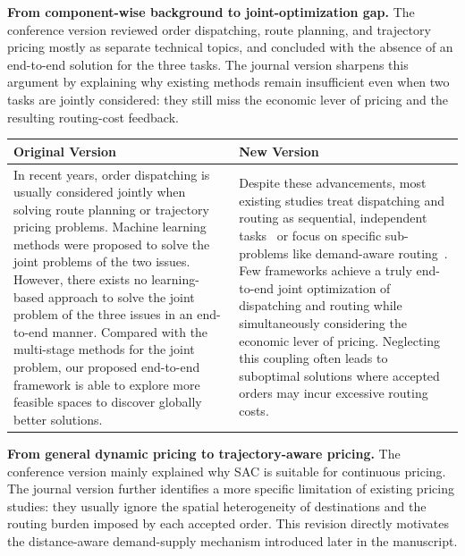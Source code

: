 \documentclass[11pt, a4paper]{article}
\begin{document}
\begin{itemize}
    \textbf{From component-wise background to joint-optimization gap.} The conference version reviewed order dispatching, route planning, and trajectory pricing mostly as separate technical topics, and concluded with the absence of an end-to-end solution for the three tasks. The journal version sharpens this argument by explaining why existing methods remain insufficient even when two tasks are jointly considered: they still miss the economic lever of pricing and the resulting routing-cost feedback.
    
    \begin{tabular}{|p{}|p{}|}
        \hline
        \textbf{Original Version} & \textbf{New Version}\\
        \hline
        In recent years, order dispatching is usually considered jointly when solving route planning or trajectory pricing problems. Machine learning methods were proposed to solve the joint problems of the two issues. However, there exists no learning-based approach to solve the joint problem of the three issues in an end-to-end manner. Compared with the multi-stage methods for the joint problem, our proposed end-to-end framework is able to explore more feasible spaces to discover globally better solutions. &
        Despite these advancements, most existing studies treat dispatching and routing as sequential, independent tasks~\cite{ref:DPEA} or focus on specific sub-problems like demand-aware routing~\cite{ref:DemandAware}. Few frameworks achieve a truly end-to-end joint optimization of dispatching and routing while simultaneously considering the economic lever of pricing. Neglecting this coupling often leads to suboptimal solutions where accepted orders may incur excessive routing costs.\\
        \hline
    \end{tabular}

    \textbf{From general dynamic pricing to trajectory-aware pricing.} The conference version mainly explained why SAC is suitable for continuous pricing. The journal version further identifies a more specific limitation of existing pricing studies: they usually ignore the spatial heterogeneity of destinations and the routing burden imposed by each accepted order. This revision directly motivates the distance-aware demand-supply mechanism introduced later in the manuscript.
    

\end{itemize}
\end{document}
